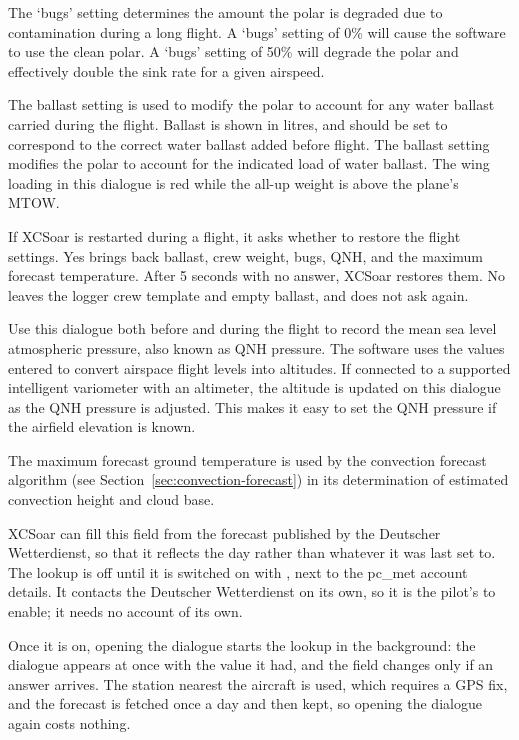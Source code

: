The `bugs' setting determines the amount the polar is degraded
due to contamination during a long flight.  A `bugs' setting of 0\%
will cause the software to use the clean polar. A `bugs' setting of
50\% will degrade the polar and effectively double the sink
rate for a given airspeed.

The ballast setting is used to modify the polar to account for any
water ballast carried during the flight. Ballast is shown in litres,
and should be set to correspond to the correct water ballast added
before flight.  The ballast setting modifies the polar to account for
the indicated load of water ballast.  The wing loading in this
dialogue is red while the all-up weight is above the plane's MTOW.

If XCSoar is restarted during a flight, it asks whether to restore
the flight settings. Yes brings back ballast, crew weight, bugs, QNH,
and the maximum forecast temperature. After 5 seconds with no answer,
XCSoar restores them. No leaves the logger crew template and empty
ballast, and does not ask again.

Use this dialogue both before and during the flight to record the mean
sea level atmospheric pressure, also known as QNH pressure.  The
software uses the values entered to convert airspace flight levels
into altitudes.  If connected to a supported intelligent variometer
with an altimeter, the altitude is updated on this dialogue as the QNH
pressure is adjusted.  This makes it easy to set the QNH pressure if
the airfield elevation is known.

The maximum forecast ground temperature is used by the convection
forecast algorithm (see Section~\ref{sec:convection-forecast}) in its
determination of estimated convection height and cloud base.

XCSoar can fill this field from the forecast published by the Deutscher
Wetterdienst, so that it reflects the day rather than whatever it was
last set to.  The lookup is off until it is switched on with
\blink{}\blink{}%
\blink{}\blink{}, next to the pc\_met account details.  It contacts the
Deutscher Wetterdienst on its own, so it is the pilot's to enable; it
needs no account of its own.

Once it is on, opening the dialogue starts the lookup in the
background: the dialogue appears at once with the value it had, and
the field changes only if an answer arrives.  The station nearest the
aircraft is used, which requires a GPS fix, and the forecast is
fetched once a day and then kept, so opening the dialogue again costs
nothing.

